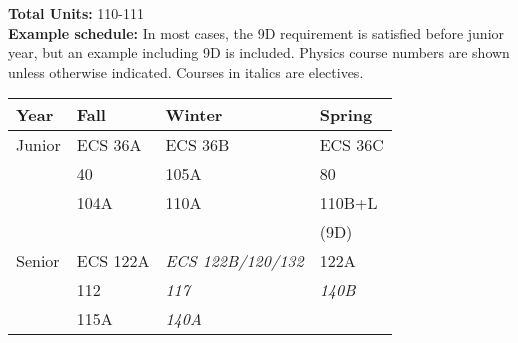 \documentclass[12pt]{article}
\begin{document}
{\bf Total Units:} 110-111\\
\vskip 0.25cm
\noindent
{\bf Example schedule:} In most cases, the 9D requirement is
satisfied before junior year, but an example including 9D is included.
Physics course numbers are shown unless otherwise indicated.  Courses
in italics are electives.\\
\begin{center}
\begin{tabular}{|l|l|l|l|}
\hline
Year      & Fall    & Winter & Spring \\
\hline
Junior    & ECS 36A    & ECS 36B      & ECS 36C \\
          & 40         & 105A         & 80 \\
          & 104A       & 110A         & 110B+L \\
          &            &              & (9D) \\         
\hline
Senior   & ECS 122A    & {\it ECS 122B/120/132} & 122A \\
         & 112         & {\it 117}             & {\it 140B}\\
         & 115A        & {\it 140A}             & \\
\hline
\end{tabular}
\end{center}
\end{document}
